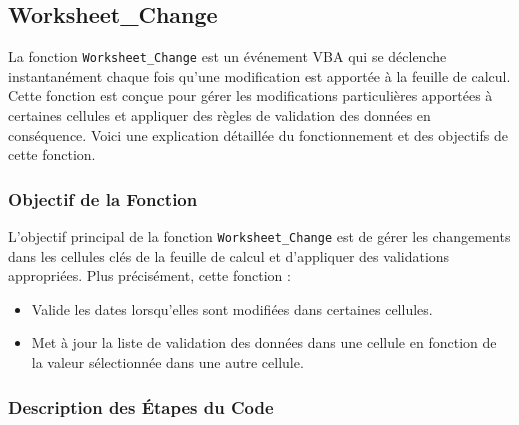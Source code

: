\documentclass[a4paper, oneside, 12pt, final]{extreport}
\begin{document}
\subsection{Worksheet\_Change}

La fonction \texttt{Worksheet\_Change} est un événement VBA qui se déclenche instantanément chaque fois qu'une modification est apportée à la feuille de calcul. Cette fonction est conçue pour gérer les modifications particulières apportées à certaines cellules et appliquer des règles de validation des données en conséquence. Voici une explication détaillée du fonctionnement et des objectifs de cette fonction.

\subsubsection{Objectif de la Fonction}

L'objectif principal de la fonction \texttt{Worksheet\_Change} est de gérer les changements dans les cellules clés de la feuille de calcul et d'appliquer des validations appropriées. Plus précisément, cette fonction :

\begin{itemize}
    \item Valide les dates lorsqu'elles sont modifiées dans certaines cellules.
    \item Met à jour la liste de validation des données dans une cellule en fonction de la valeur sélectionnée dans une autre cellule.
\end{itemize}

\subsubsection{Description des Étapes du Code}
\end{document}
